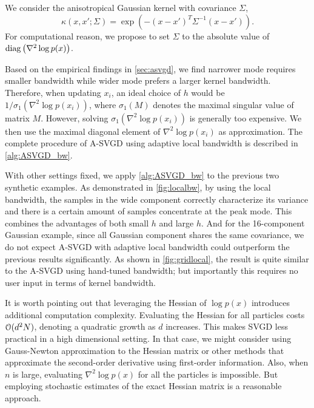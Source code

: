 We consider the anisotropical Gaussian kernel with covariance $\Sigma$,
\[
\kappa(x, x'; \Sigma) = \exp(-(x - x')^T \Sigma^{-1}(x- x')  ).  
\]
For computational reason, we propose to set $\Sigma $ to the absolute value of $\operatorname{diag} \left(\nabla^2 \log p(x) \right)$.


Based on the empirical findings in \cref{sec:asvgd}, we find narrower mode requires smaller bandwidth while wider mode prefers a larger kernel bandwidth. 
Therefore, when updating $x_i$, an ideal choice of $h$ would be $1/ \sigma_1(\nabla^2 \log p(x_i))$, where $\sigma_1(M)$ denotes the maximal singular value of matrix $M$. However, solving  $\sigma_1(\nabla^2 \log p(x_i))$ is generally too expensive. We then use the maximal diagonal element of $\nabla^2 \log p(x_i)$ as approximation. The complete procedure of A-SVGD using adaptive local bandwidth is described in \cref{alg:ASVGD_bw}.

With other settings fixed, we apply \cref{alg:ASVGD_bw} to the previous two synthetic examples. As demonstrated in \cref{fig:localbw}, by using the local bandwidth, the samples in the wide component correctly characterize its variance and there is a certain amount of samples concentrate at the peak mode. This combines the advantages of both small $h$ and large $h$. And for the 16-component Gaussian example, since all Gaussian component shares the same covariance, we do not expect  A-SVGD with adaptive local bandwidth could outperform the previous results significantly. As shown in \cref{fig:gridlocal}, the result is quite similar to the A-SVGD using hand-tuned bandwidth; but importantly this  requires no user input in terms of kernel bandwidth.

It is worth pointing out that leveraging the Hessian of $\log p(x)$ introduces additional computation complexity. Evaluating the Hessian for all particles costs $\mathcal{O}(d^2N)$, denoting a quadratic growth as $d$ increases. This makes SVGD less practical in a high dimensional setting. In that case, we might consider using Gauss-Newton approximation to the Hessian matrix or other methods that approximate the second-order derivative using first-order information.
Also, when $n$ is large, evaluating $\nabla^2 \log p(x)$ for all the particles is impossible. But employing  stochastic estimates of the exact Hessian matrix is a reasonable approach.  